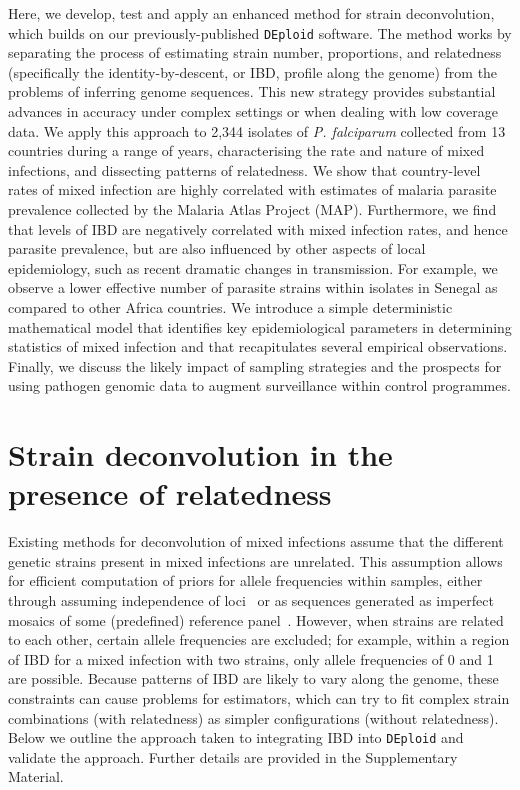 \documentclass[9pt,lineno]{elife}
\begin{document}
Here, we develop, test and apply an enhanced method for strain deconvolution, which builds on our previously-published \texttt{DEploid} software.  The method works by separating the process of estimating strain number, proportions, and relatedness (specifically the identity-by-descent, or IBD, profile along the genome) from the problems of inferring genome sequences. This new strategy provides substantial advances in accuracy under complex settings or when dealing with low coverage data.  We apply this approach to 2,344 isolates of {\it P. falciparum} collected from 13 countries during a range of years, characterising the rate and nature of mixed infections, and dissecting patterns of relatedness.  We show that country-level rates of mixed infection are highly correlated with estimates of malaria parasite prevalence collected by the Malaria Atlas Project (MAP). Furthermore, we find that levels of IBD are negatively correlated with mixed infection rates, and hence parasite prevalence, but are also influenced by other aspects of local epidemiology, such as recent dramatic changes in transmission. For example, we observe a lower effective number of parasite strains within isolates in Senegal as compared to other Africa countries.  We introduce a simple deterministic mathematical model that identifies key epidemiological parameters in determining statistics of mixed infection and that recapitulates several empirical observations.  Finally, we discuss the likely impact of sampling strategies and the prospects for using pathogen genomic data to augment surveillance within control programmes.



\section{Strain deconvolution in the presence of relatedness}

Existing methods for deconvolution of mixed infections assume that the different genetic strains present in mixed infections are unrelated.  This assumption allows for efficient computation of priors for allele frequencies within samples, either through assuming independence of loci~\citep{Jack2016} or as sequences generated as imperfect mosaics of some (predefined) reference panel~\citep{Zhu2017}.  However, when strains are related to each other, certain allele frequencies are excluded; for example, within a region of IBD for a mixed infection with two strains, only allele frequencies of 0 and 1 are possible.  Because patterns of IBD are likely to vary along the genome, these constraints can cause problems for estimators, which can try to fit complex strain combinations (with relatedness) as simpler configurations (without relatedness).  Below we outline the approach taken to integrating IBD into \texttt{DEploid} and validate the approach.  Further details are provided in the Supplementary Material.
\end{document}
